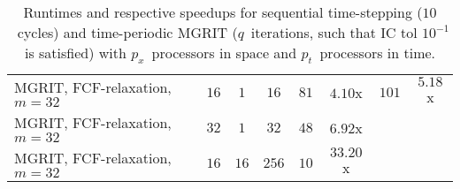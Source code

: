 \documentclass[3p]{elsarticle}
\begin{document}
\begin{table}
\begin{tabular}{ l || c  c  c | c  c | c  c }
        MGRIT, FCF-relaxation, $m = 32$   & $16$  & $1$   & $16$      & $81$              & $4.10$x   & $101$     & $5.18$x   \\
        MGRIT, FCF-relaxation, $m = 32$   & $32$  & $1$   & $32$      & $48$              & $6.92$x   &           &           \\
        MGRIT, FCF-relaxation, $m = 32$   & $16$  & $16$  & $256$     & $10$              & $33.20$x  &           &           \\
    \end{tabular}
    \caption{Runtimes and respective speedups for sequential time-stepping ($10$~cycles)
        and time-periodic MGRIT ($q$~iterations, such that IC tol $10^{-1}$ is satisfied)
        with $p_x$~processors in space and $p_t$~processors in time.}
	\label{stenosed-valve-runtimes-speedup-LEAD-TheoSim-tab}
\end{table}
\FloatBarrier
\end{document}
